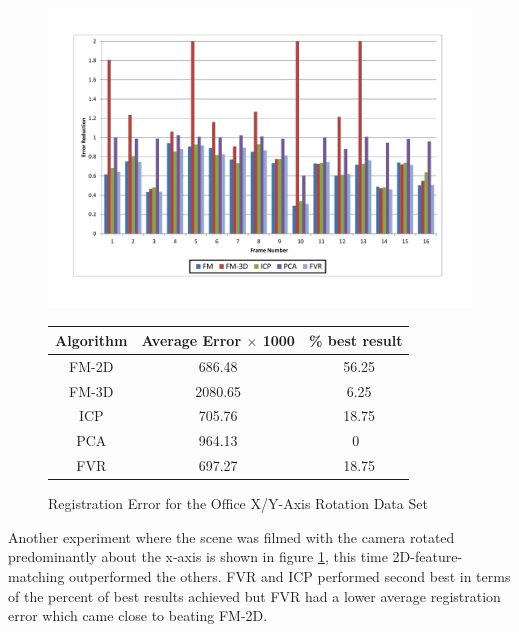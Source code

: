 \begin{figure}
\centering
\includegraphics[width=6in]{images/results/Office_Texture_Rotate_XAxis}
\caption{Registration Error for the Office X/Y-Axis Rotation Data Set}
\label{fig:PET10}

\begin{tabular}{ccc}
\hline
\textbf{Algorithm} & \textbf{Average Error $\times$ 1000} & \textbf{\% best result}\\ \hline
FM-2D	& 686.48 & ~56.25\\
FM-3D	& 2080.65 & ~6.25\\
ICP		& 705.76 & ~18.75\\
PCA		& 964.13 & 0\\
FVR		& 697.27 & ~18.75\\
\end{tabular}
\end{figure} 


Another experiment where the scene was filmed with the camera rotated predominantly about the x-axis is shown in figure \ref{fig:PET10}, this time 2D-feature-matching outperformed the others. FVR and ICP performed second best in terms of the percent of best results achieved but FVR had a lower average registration error which came close to beating FM-2D.  

